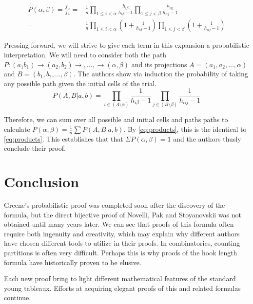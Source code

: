 \documentclass[11pt]{article}
\theoremstyle{definition}
\begin{document}
\begin{equation}\label{eq:products}
    \begin{split}
        P(\alpha,\beta) = \frac{f_\alpha}{f_\lambda} =& \frac{1}{n} \prod_{1 \leq i < \alpha} \frac{h_{i\beta}}{h_{i\beta} - 1} \prod_{1 \leq j < \beta} \frac{h_{\alpha j}}{h_{\alpha j} - 1}\\
        =& \frac{1}{n} \prod_{1 \leq i < \alpha} (1 + \frac{1}{h_{i\beta} - 1}) \prod_{1 \leq j < \beta} (1 + \frac{1}{h_{\alpha j} - 1})
    \end{split}
\end{equation}

Pressing forward, we will strive to give each term in this expansion a probabilistic interpretation. We will need to consider both the path $P:(a_1 b_1) \rightarrow (a_2,b_2) \rightarrow,\ldots,\rightarrow (\alpha,\beta)$ and its projections $A = (a_1,a_2,\ldots,\alpha)$ and $B = (b_1,b_2,\ldots,\beta)$. The authors show via induction the probability of taking any possible path given the initial cells of the trial.
\begin{equation}
P(A,B | a,b) = \prod_{i \in (A \setminus \alpha)} \frac{1}{h_{i\beta} - 1} \prod_{j \in (B \setminus \beta)} \frac{1}{h_{\alpha j} - 1}
\end{equation}

Therefore, we can sum over all possible and initial cells and paths paths to calculate $P(\alpha,\beta) = \frac{1}{n}\sum P(A,B|a,b)$. By \eqref{eq:products}, this is the identical to \ref{eq:products}. This establishes that that $\Sigma P(\alpha,\beta) = 1$ and the authors thusly conclude their proof. 
\section{Conclusion}
Greene's probabilistic proof was completed soon after the discovery of the formula, but the direct bijective proof of Novelli, Pak and Stoyanovskii was not obtained until many years later. We can see that proofs of this formula often require both ingenuity and creativity, which may explain why different authors have chosen different tools to utilize in their proofs. In combinatorics, counting partitions is often very difficult. Perhaps this is why proofs of the hook length formula have historically proven to be elusive.

Each new proof bring to light different mathematical features of the standard young tableaux. Efforts at acquiring elegant proofs of this and related formulas continue.



\end{document}
